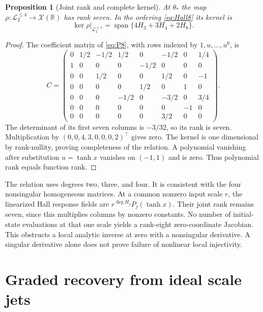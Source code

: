 \documentclass[11pt,a4paper]{article}
\numberwithin{equation}{section}
\newtheorem{proposition}[theorem]{Proposition}
\theoremstyle{definition}
\theoremstyle{remark}
\DeclareMathOperator{\spanop}{span}
\newcommand{\R}{\mathbb R}
\newcommand{\Lie}{\mathcal L}
\begin{document}
\begin{proposition}[Joint rank and complete kernel]\label{prop:cross}
At $\theta_*$ the map $\rho:\Lie_2^{\leq4}\to\mathcal X(\R)$ has
rank seven. In the ordering \eqref{eq:Hall8} its kernel is
\begin{equation}\label{eq:kernel8}
 \ker\rho|_{\Lie_2^{\leq4}}=
 \spanop\{4H_3+3H_4+2H_8\}.
\end{equation}
\end{proposition}
\begin{proof}
The coefficient matrix of \eqref{eq:P8}, with rows indexed by
$1,u,\ldots,u^6$, is
\begin{equation}\label{eq:coeffmatrix}
 C=\begin{pmatrix}
 0&1/2&-1/2&1/2&0&-1/2&0&1/4\\
 1&0&0&0&-1/2&0&0&0\\
 0&0&1/2&0&0&1/2&0&-1\\
 0&0&0&0&1/2&0&1&0\\
 0&0&0&-1/2&0&-3/2&0&3/4\\
 0&0&0&0&0&0&-1&0\\
 0&0&0&0&0&3/2&0&0
 \end{pmatrix}.
\end{equation}
The determinant of its first seven columns is $-3/32$, so its rank is
seven. Multiplication by $(0,0,4,3,0,0,0,2)^\top$ gives zero. The kernel
is one dimensional by rank-nullity, proving completeness of the relation.
A polynomial vanishing after substitution $u=\tanh x$ vanishes on
$(-1,1)$ and is zero. Thus polynomial rank equals function rank.
\end{proof}

The relation uses degrees two, three, and four. It is consistent with the
four nonsingular homogeneous matrices. At a common nonzero input scale
$r$, the linearized Hall response fields are $r^{\deg H_j}P_j(\tanh x)$.
Their joint rank remains seven, since this multiplies columns by nonzero
constants. No number of initial-state evaluations at that one scale yields
a rank-eight zero-coordinate Jacobian. This obstructs a local analytic
inverse at zero with a nonsingular derivative. A singular derivative alone
does not prove failure of nonlinear local injectivity.

\section{Graded recovery from ideal scale jets}
\label{sec:graded}
\end{document}
